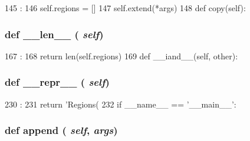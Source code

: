 \begin{DoxyCode}
145                              :
146         self.regions = []
147         self.extend(*args)
148 
    def copy(self):
\end{DoxyCode}
\hypertarget{classm5_1_1util_1_1region_1_1Regions_af6412d48d9a71eac81e3195b52455aaa}{
\subsubsection[{\_\-\_\-len\_\-\_\-}]{\setlength{\rightskip}{0pt plus 5cm}def \_\-\_\-len\_\-\_\- ( {\em self})}}
\label{classm5_1_1util_1_1region_1_1Regions_af6412d48d9a71eac81e3195b52455aaa}



\begin{DoxyCode}
167                      :
168         return len(self.regions)
169 
    def __iand__(self, other):
\end{DoxyCode}
\hypertarget{classm5_1_1util_1_1region_1_1Regions_ad8b9328939df072e4740cd9a63189744}{
\subsubsection[{\_\-\_\-repr\_\-\_\-}]{\setlength{\rightskip}{0pt plus 5cm}def \_\-\_\-repr\_\-\_\- ( {\em self})}}
\label{classm5_1_1util_1_1region_1_1Regions_ad8b9328939df072e4740cd9a63189744}



\begin{DoxyCode}
230                       :
231         return 'Regions(%
232 
if __name__ == '__main__':
\end{DoxyCode}
\hypertarget{classm5_1_1util_1_1region_1_1Regions_a69e6c03a1e37f0277f464db19e5fd985}{
\subsubsection[{append}]{\setlength{\rightskip}{0pt plus 5cm}def append ( {\em self}, \/   {\em args})}}
\label{classm5_1_1util_1_1region_1_1Regions_a69e6c03a1e37f0277f464db19e5fd985}



